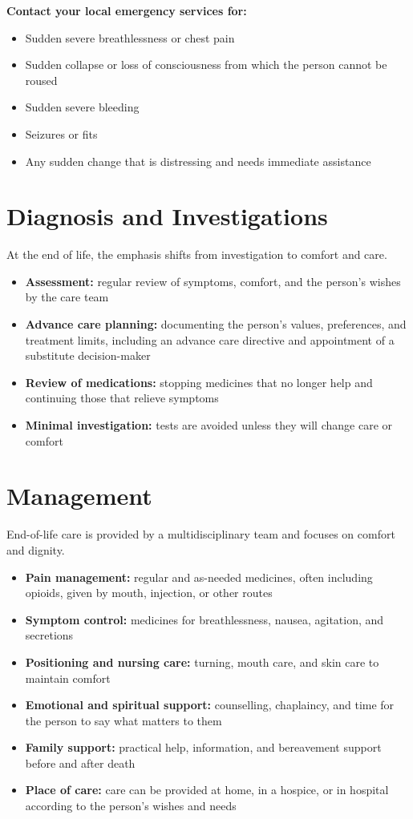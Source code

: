 \textbf{Contact your local emergency services for:}
\begin{itemize}
    \item Sudden severe breathlessness or chest pain
    \item Sudden collapse or loss of consciousness from which the person cannot be roused
    \item Sudden severe bleeding
    \item Seizures or fits
    \item Any sudden change that is distressing and needs immediate assistance
\end{itemize}

\section*{Diagnosis and Investigations}
At the end of life, the emphasis shifts from investigation to comfort and care.
\begin{itemize}
    \item \textbf{Assessment:} regular review of symptoms, comfort, and the person's wishes by the care team
    \item \textbf{Advance care planning:} documenting the person's values, preferences, and treatment limits, including an advance care directive and appointment of a substitute decision-maker
    \item \textbf{Review of medications:} stopping medicines that no longer help and continuing those that relieve symptoms
    \item \textbf{Minimal investigation:} tests are avoided unless they will change care or comfort
\end{itemize}

\section*{Management}
End-of-life care is provided by a multidisciplinary team and focuses on comfort and dignity.
\begin{itemize}
    \item \textbf{Pain management:} regular and as-needed medicines, often including opioids, given by mouth, injection, or other routes
    \item \textbf{Symptom control:} medicines for breathlessness, nausea, agitation, and secretions
    \item \textbf{Positioning and nursing care:} turning, mouth care, and skin care to maintain comfort
    \item \textbf{Emotional and spiritual support:} counselling, chaplaincy, and time for the person to say what matters to them
    \item \textbf{Family support:} practical help, information, and bereavement support before and after death
    \item \textbf{Place of care:} care can be provided at home, in a hospice, or in hospital according to the person's wishes and needs
\end{itemize}

